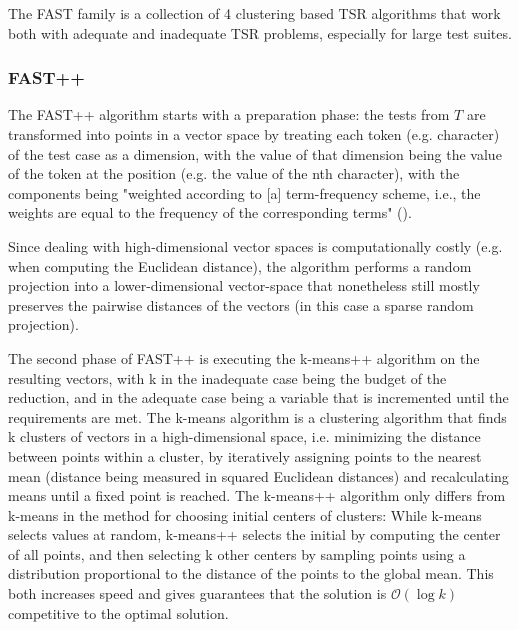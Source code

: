 The FAST family is a collection of 4 clustering based TSR algorithms
that work both with adequate and inadequate TSR problems, especially
for large test suites.

\subsubsection{FAST++}


The FAST++ algorithm starts with a preparation phase: the tests from $T$
are transformed into points in a vector space by treating each token
(e.g. character) of the test case as a dimension, with the value of that
dimension being the value of the token at the position (e.g. the value
of the nth character), with the components being "weighted according to
[a] term-frequency scheme, i.e., the weights are equal to the frequency
of the corresponding terms" (\cite{cruciani2019scalable}).

Since dealing with high-dimensional vector spaces is computationally
costly (e.g. when computing the Euclidean distance), the algorithm
performs a random projection into a lower-dimensional vector-space that
nonetheless still mostly preserves the pairwise distances of the vectors
(in this case a sparse random projection).

The second phase of FAST++ is executing the k-means++ algorithm %
on the resulting vectors, with k in the inadequate case being the
budget of the reduction, and in the adequate case being a variable
that is incremented until the requirements are met. The k-means
algorithm is a clustering algorithm that finds k clusters of vectors in a
high-dimensional space, i.e. minimizing the distance between points within
a cluster, by iteratively assigning points to the nearest mean (distance
being measured in squared Euclidean distances) and recalculating means
until a fixed point is reached. The k-means++ algorithm only differs
from k-means in the method for choosing initial centers of clusters:
While k-means selects values at random, k-means++ selects the initial by
computing the center of all points, and then selecting k other centers by
sampling points using a distribution proportional to the distance of the
points to the global mean. This both increases speed %
and gives guarantees that the solution is $\mathcal{O}(\log k)$ competitive
to the optimal solution. %

